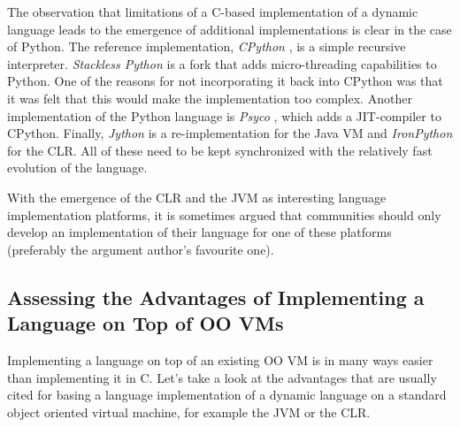 \documentclass{llncs}
\begin{document}
\def\implname#1{\emph{#1}}

The observation that limitations of a C-based implementation of a dynamic
language leads to the emergence of additional implementations is clear
in the case of Python.  The reference implementation, \implname{CPython}
\cite{cpy251}, is a simple recursive interpreter.  \implname{Stackless
Python} \cite{stackless} is a fork that adds micro-threading
capabilities to Python. One of the reasons for not incorporating it back
into CPython was that it was felt that this would make the
implementation too complex. Another implementation of the Python
language is \implname{Psyco} \cite{psyco-software}, which adds a
JIT-compiler to CPython.  Finally, \implname{Jython} is a
re-implementation for the Java VM and \implname{IronPython} for
the CLR.  All of these need to be kept synchronized with the relatively fast
evolution of the language.

With the emergence of the CLR and the JVM as interesting language
implementation platforms, it is sometimes argued that
communities should only develop an implementation of their language
for one of these platforms (preferably the argument author's favourite
one).

\subsection{Assessing the Advantages of Implementing a Language on Top of OO
VMs}

Implementing a language on top of an existing OO VM is in many ways easier than
implementing it in C. Let's take a look at the advantages that are usually
cited for basing a
language implementation of a dynamic language on a standard object oriented
virtual machine, for example the JVM or the CLR.
\end{document}
